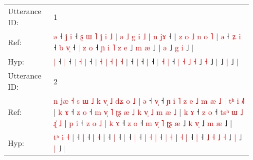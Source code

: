 \documentclass[10pt]{article}
\DeclareRobustCommand{\hl}[1]{{\textcolor{red}{#1}}}
\begin{document}
\begin{longtable}{ll}
\toprule
Utterance ID: & 1 \\
Ref: & \hl{ə} ˧\hl{ }\hl{ʝ} \hl{i} ˧\hl{ }\hl{ʂ}\hl{ }\hl{ɯ}\hl{ }\hl{˥}\hl{ }\hl{ʝ}\hl{ }\hl{i}\hl{ }\hl{˩} |\hl{ }\hl{ə}\hl{ }\hl{˩}\hl{ }\hl{g}\hl{ }\hl{i} \hl{˩} |\hl{ }\hl{n}\hl{ }\hl{j}\hl{ɤ} ˧ |\hl{ }\hl{z} \hl{o} \hl{˩} \hl{n} \hl{o} \hl{˥} |\hl{ }\hl{ə} ˧\hl{ }\hl{ʑ} \hl{i} ˧\hl{ }\hl{b} \hl{v}\hl{̩} ˧ | \hl{z} \hl{o} ˧\hl{ }\hl{ɲ} \hl{i} \hl{˥} \hl{z} \hl{e} ˩\hl{ }\hl{m} \hl{æ} ˩ |\hl{ }\hl{ə} ˩\hl{ }\hl{g} \hl{i} ˩ |
 \\
Hyp: & \hl{|} ˧\hl{}\hl{} \hl{|} ˧\hl{}\hl{}\hl{}\hl{}\hl{}\hl{}\hl{}\hl{}\hl{}\hl{}\hl{}\hl{} |\hl{}\hl{}\hl{}\hl{}\hl{}\hl{}\hl{}\hl{} \hl{˧} |\hl{}\hl{}\hl{}\hl{}\hl{} ˧ |\hl{}\hl{} \hl{˧} \hl{|} \hl{˧} \hl{|} \hl{˧} |\hl{}\hl{} ˧\hl{}\hl{} \hl{|} ˧\hl{}\hl{} \hl{}\hl{|} ˧ | \hl{˧} \hl{|} ˧\hl{}\hl{} \hl{|} \hl{˧} \hl{˩} \hl{˧} ˩\hl{}\hl{} \hl{˧} ˩ |\hl{}\hl{} ˩\hl{}\hl{} \hl{|} ˩ |
 \\
\midrule
Utterance ID: & 2 \\
Ref: & \hl{n}\hl{ }\hl{j}\hl{æ}\hl{ }\hl{˧}\hl{ }\hl{s}\hl{ }\hl{ɯ}\hl{ }\hl{˩}\hl{ }\hl{k}\hl{ }\hl{v}\hl{̩}\hl{ }\hl{˩}\hl{ }\hl{d}\hl{ʑ} \hl{o} \hl{˩} |\hl{ }\hl{ə} ˧ \hl{v}\hl{̩} ˧\hl{ }\hl{ɲ}\hl{ }\hl{i}\hl{ }\hl{˥}\hl{ }\hl{z}\hl{ }\hl{e}\hl{ }\hl{˩}\hl{ }\hl{m}\hl{ }\hl{æ}\hl{ }\hl{˩} |\hl{ }\hl{t}\hl{ʰ}\hl{ }\hl{i} \hl{˩}\hl{˥} |\hl{ }\hl{k}\hl{ }\hl{ɤ} ˧\hl{ }\hl{z} \hl{o} ˧\hl{ }\hl{m}\hl{ }\hl{v}\hl{̩}\hl{ }\hl{˥}\hl{ }\hl{ʈ}\hl{ʂ}\hl{ }\hl{æ}\hl{ }\hl{˩}\hl{ }\hl{k}\hl{ }\hl{v}\hl{̩}\hl{ }\hl{˩}\hl{ }\hl{m}\hl{ }\hl{æ}\hl{ }\hl{˩} |\hl{ }\hl{k}\hl{ }\hl{ɤ} ˧\hl{ }\hl{z} \hl{o} ˧\hl{ }\hl{t}\hl{s}\hl{ʰ}\hl{ }\hl{ɯ}\hl{ }\hl{˩}\hl{ }\hl{ɻ}\hl{̍}\hl{ }\hl{˩} | \hl{p} \hl{i} ˧\hl{ }\hl{z} \hl{o} \hl{˩} | \hl{k} \hl{ɤ} ˧\hl{ }\hl{z} \hl{o} ˧\hl{ }\hl{m} \hl{v}\hl{̩} \hl{˥} \hl{ʈ}\hl{ʂ} \hl{æ} ˩\hl{ }\hl{k} \hl{v}\hl{̩} ˩\hl{ }\hl{m} \hl{æ} ˩ |
 \\
Hyp: & \hl{}\hl{}\hl{}\hl{}\hl{}\hl{}\hl{}\hl{}\hl{}\hl{}\hl{}\hl{}\hl{}\hl{}\hl{}\hl{}\hl{}\hl{}\hl{}\hl{}\hl{t}\hl{ʰ} \hl{i} \hl{˧} |\hl{}\hl{} ˧ \hl{}\hl{|} ˧\hl{}\hl{}\hl{}\hl{}\hl{}\hl{}\hl{}\hl{}\hl{}\hl{}\hl{}\hl{}\hl{}\hl{}\hl{}\hl{}\hl{}\hl{} |\hl{}\hl{}\hl{}\hl{}\hl{} \hl{}\hl{˧} |\hl{}\hl{}\hl{}\hl{} ˧\hl{}\hl{} \hl{|} ˧\hl{}\hl{}\hl{}\hl{}\hl{}\hl{}\hl{}\hl{}\hl{}\hl{}\hl{}\hl{}\hl{}\hl{}\hl{}\hl{}\hl{}\hl{}\hl{}\hl{}\hl{}\hl{}\hl{}\hl{}\hl{}\hl{}\hl{} |\hl{}\hl{}\hl{}\hl{} ˧\hl{}\hl{} \hl{|} ˧\hl{}\hl{}\hl{}\hl{}\hl{}\hl{}\hl{}\hl{}\hl{}\hl{}\hl{}\hl{}\hl{} | \hl{˧} \hl{|} ˧\hl{}\hl{} \hl{|} \hl{˧} | \hl{˧} \hl{|} ˧\hl{}\hl{} \hl{|} ˧\hl{}\hl{} \hl{}\hl{˩} \hl{˧} \hl{}\hl{˩} \hl{˧} ˩\hl{}\hl{} \hl{}\hl{|} ˩\hl{}\hl{} \hl{|} ˩ |

\end{longtable}
\end{document}
